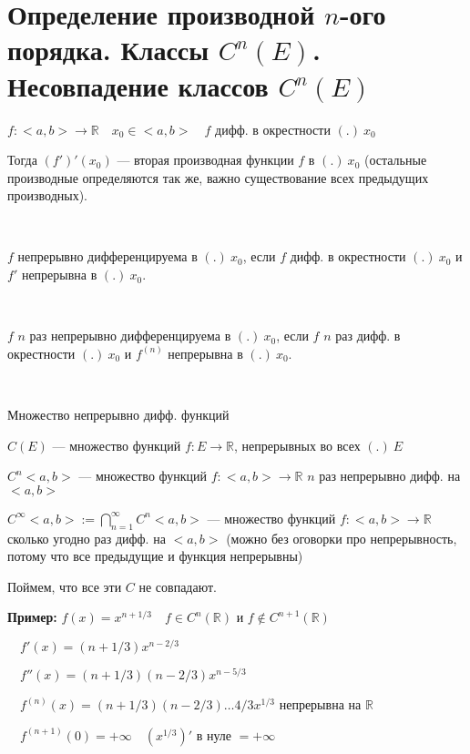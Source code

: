 \section{Определение производной $n$-ого порядка. Классы $C^n(E)$. Несовпадение классов $C^n(E)$}

\begin{conj} 
    $f: <a, b> \rightarrow \mathbb{R} \quad x_0 \in <a, b> \quad f$ дифф. в окрестности $(.) \ x_0$

    Тогда $(f')'(x_0)$ --- вторая производная функции $f$ в $(.) \ x_0$ (остальные производные определяются так же, важно существование всех предыдущих производных).
\end{conj}
\
\begin{conj}
    $f$ непрерывно дифференцируема в $(.) \ x_0$, если $f$ дифф. в окрестности $(.) \ x_0$ и $f'$ непрерывна в $(.) \ x_0$.
\end{conj}
\
\begin{conj}
    $f$ $n$ раз непрерывно дифференцируема в $(.) \ x_0$, если $f$ $n$ раз дифф. в окрестности $(.) \ x_0$ и $f^{(n)}$ непрерывна в $(.) \ x_0$.
\end{conj}
\
\begin{conj}
    Множество непрерывно дифф. функций

    $C(E)$ --- множество функций $f: E \rightarrow \mathbb{R}$, непрерывных во всех $(.) \ E$

    $C^n<a, b>$ --- множество функций $f:<a, b> \rightarrow \mathbb{R}$ $n$ раз непрерывно дифф. на $<a, b>$

    $C^\infty<a, b> := \bigcap\limits_{n=1}^{\infty} C^n<a,b>$ --- множество функций $f:<a, b> \rightarrow \mathbb{R}$ сколько угодно раз дифф. на $<a, b>$ (можно без оговорки про непрерывность, потому что все предыдущие и функция непрерывны)
\end{conj}

Поймем, что все эти $C$ не совпадают.
\par\medskip
\textbf{Пример:} $f(x) = x^{n+1/3} \quad f \in C^n(\mathbb{R})$ и $f \notin C^{n+1}(\mathbb{R})$

$\quad f'(x) = (n + 1/3)x^{n-2/3}$

$\quad f''(x) = (n+1/3)(n-2/3)x^{n-5/3}$

$\quad f^{(n)}(x) = (n+1/3)(n-2/3) \dots 4/3 x^{1/3}$ непрерывна на $\mathbb{R}$

$\quad f^{(n+1)}(0) = +\infty \quad (x^{1/3})'$ в нуле $= +\infty$


